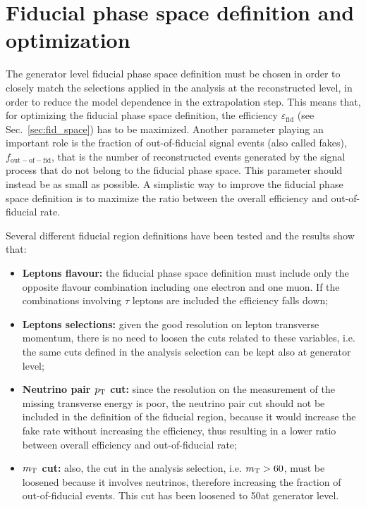 \chapter{Fiducial phase space definition and optimization}\label{app:fiducial_region}
\thispagestyle{empty}
	
The generator level fiducial phase space definition must be chosen in order to closely match the selections applied in the analysis at the reconstructed level, in order to reduce the model dependence in the extrapolation step. This means that, for optimizing the fiducial phase space definition, the efficiency $\varepsilon_\mathrm{fid}$ (see Sec.~\ref{sec:fid_space}) has to be maximized. Another parameter playing an important role is the fraction of out-of-fiducial signal events (also called fakes), $f_\mathrm{out-of-fid}$, that is the number of reconstructed events generated by the signal process that do not belong to the fiducial phase space. This parameter should instead be as small as possible. A simplistic way to improve the fiducial phase space definition is to maximize the ratio between the overall efficiency and out-of-fiducial rate.

Several different fiducial region definitions have been tested and the results show that:
\begin{itemize}
\item {\bf Leptons flavour:} the fiducial phase space definition must include only the opposite flavour combination including one electron and one muon. If the combinations involving $\tau$ leptons are included the efficiency falls down;
\item {\bf Leptons selections:} given the good resolution on lepton transverse momentum, there is no need to loosen the cuts related to these variables, i.e. the same cuts defined in the analysis selection can be kept also at generator level;
\item {\bf Neutrino pair \boldmath$p_\mathrm{T}$ cut:} since the resolution on the measurement of the missing transverse energy is poor, the neutrino pair cut should not be included in the definition of the fiducial region, because it would increase the fake rate without increasing the efficiency, thus resulting in a lower ratio between overall efficiency and out-of-fiducial rate;
\item {\bf \boldmath$m_\mathrm{T}$ cut:} also, the \mt cut in the analysis selection, i.e. $m_\mathrm{T}>60$\GeV, must be loosened because it involves neutrinos, therefore increasing the fraction of out-of-fiducial events. This cut has been loosened to 50\GeV at generator level.
\end{itemize}

